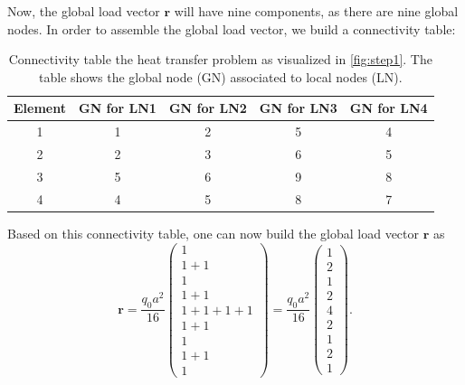 \documentclass[a4paper,11pt]{article}
\numberwithin{equation}{section}
\newcommand\vect[1]{\ensuremath{\bm{#1}}}
\begin{document}
{Now, the global load vector $\vect{r}$ will have nine components, as there are nine global nodes. In order to assemble the global load vector, we build a connectivity table:
\begin{table}[h!]
	\centering
	\begin{tabular}{|c|c|c|c|c|}
		\hline
		\textbf{Element} & \textbf{GN for LN1} & \textbf{GN for LN2} & \textbf{GN for LN3} & \textbf{GN for LN4} \\
		\hline\hline
		1 & 1 & 2 & 5 & 4 \\
		\hline
		2 & 2 & 3 & 6 & 5 \\
		\hline
		3 & 5 & 6 & 9 & 8 \\
		\hline
		4 & 4 & 5 & 8 & 7 \\
		\hline
	\end{tabular}
	\caption{Connectivity table the heat transfer problem as visualized in \cref{fig:step1}. The table shows the global node (GN) associated to local nodes (LN).}
	\label{tab:connectivity_table}
\end{table}
Based on this connectivity table, one can now build the global load vector $\vect{r}$ as \begin{equation}
	\vect{r} = \frac{q_0a^2}{16}\begin{pmatrix}
		1 \\
		1+1 \\
		1 \\
		1+1\\
		1+1+1+1 \\
		1+1 \\
		1 \\
		1+1 \\
		1
	\end{pmatrix} = \frac{q_0a^2}{16}\begin{pmatrix}
		1 \\ 2 \\ 1 \\ 2 \\ 4 \\ 2 \\ 1 \\ 2 \\ 1
	\end{pmatrix}.
\end{equation}

}
\end{document}
